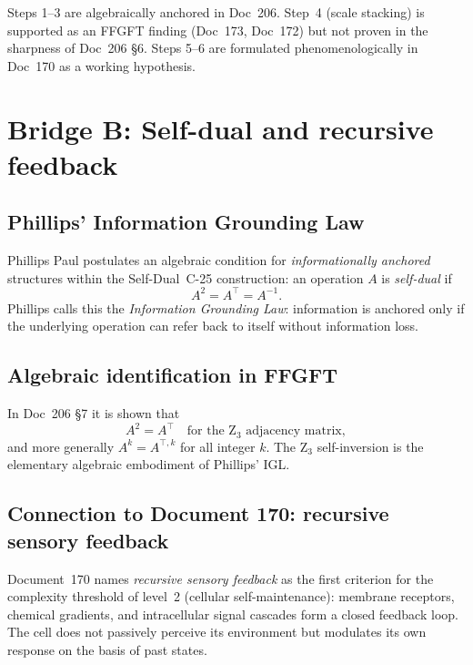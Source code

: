 Steps 1--3 are algebraically anchored in Doc~206. Step~4 (scale stacking) is supported as an FFGFT finding (Doc~173, Doc~172) but not proven in the sharpness of Doc~206 \S6. Steps 5--6 are formulated phenomenologically in Doc~170 as a working hypothesis.

\section{Bridge B: Self-dual and recursive feedback}\label{sec:bridgeB}

\subsection{Phillips' Information Grounding Law}

Phillips Paul postulates an algebraic condition for \emph{informationally anchored} structures within the Self-Dual~C-25 construction: an operation $A$ is \emph{self-dual} if
\begin{equation}
A^2 = A^\top = A^{-1}.
\end{equation}
Phillips calls this the \emph{Information Grounding Law}: information is anchored only if the underlying operation can refer back to itself without information loss.

\subsection{Algebraic identification in FFGFT}

In Doc~206 \S7 it is shown that
\begin{equation}
A^2 = A^\top \quad \text{for the Z}_3 \text{ adjacency matrix},
\end{equation}
and more generally $A^k = A^{\top, k}$ for all integer $k$. The Z$_3$ self-inversion is the elementary algebraic embodiment of Phillips' IGL.

\subsection{Connection to Document 170: recursive sensory feedback}

Document~170 names \emph{recursive sensory feedback} as the first criterion for the complexity threshold of level~2 (cellular self-maintenance): membrane receptors, chemical gradients, and intracellular signal cascades form a closed feedback loop. The cell does not passively perceive its environment but modulates its own response on the basis of past states.

